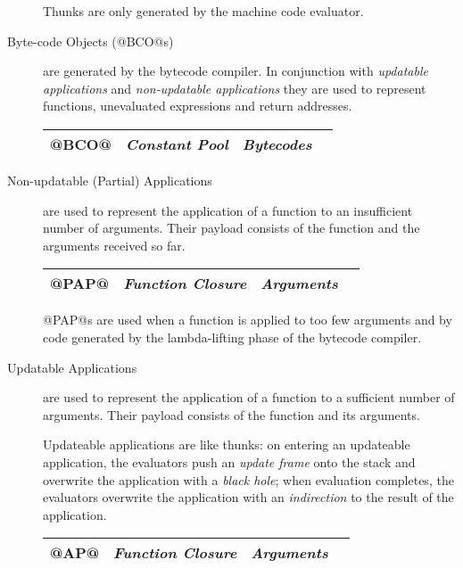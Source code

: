 \documentclass[11pt]{article}
\begin{document}
\begin{description}
Thunks are only generated by the machine code evaluator.

\item[Byte-code Objects (@BCO@s)] are generated by the bytecode
compiler.  In conjunction with \emph{updatable applications} and
\emph{non-updatable applications} they are used to represent
functions, unevaluated expressions and return addresses.

\begin{center}
\begin{tabular}{|l|l|l|l|}\hline
@BCO@ & \emph{Constant Pool} & \emph{Bytecodes} \\ \hline
\end{tabular}
\end{center}

\item[Non-updatable (Partial) Applications] are used to represent the
application of a function to an insufficient number of arguments.
Their payload consists of the function and the arguments received so far.

\begin{center}
\begin{tabular}{|l|l|l|l|}\hline
@PAP@ & \emph{Function Closure} & \emph{Arguments} \\ \hline
\end{tabular}
\end{center}

@PAP@s are used when a function is applied to too few arguments and by
code generated by the lambda-lifting phase of the bytecode compiler.

\item[Updatable Applications] are used to represent the application of
a function to a sufficient number of arguments.  Their payload
consists of the function and its arguments.  

Updateable applications are like thunks: on entering an updateable
application, the evaluators push an \emph{update frame} onto the stack
and overwrite the application with a \emph{black hole}; when
evaluation completes, the evaluators overwrite the application with an
\emph{indirection} to the result of the application.

\begin{center}
\begin{tabular}{|l|l|l|l|}\hline
@AP@ & \emph{Function Closure} & \emph{Arguments} \\ \hline
\end{tabular}
\end{center}


\end{description}
\end{document}
